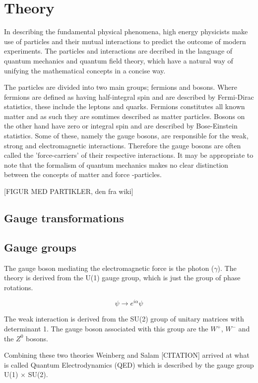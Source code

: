 \section{Theory}
In describing the fundamental physical phenomena, high energy physicists make use of particles and their mutual interactions to predict the outcome of modern experiments. The particles and interactions are decribed in the language of quantum mechanics and quantum field theory, which have a natural way of unifying the mathematical concepts in a concise way.

The particles are divided into two main groups; fermions and bosons. Where fermions are defined as having half-integral spin and are described by Fermi-Dirac statistics, these include the leptons and quarks. Fermions constitutes all known matter and as such they are somtimes described as matter particles. Bosons on the other hand have zero or integral spin and are described by Bose-Einstein statistics. Some of these, namely the gauge bosons, are responsible for the weak, strong and electromagnetic interactions. Therefore the gauge bosons are often called the 'force-carriers' of their respective interactions. It may be appropriate to note that the formalism of quantum mechanics makes no clear distinction between the concepts of matter and force -particles.

[FIGUR MED PARTIKLER, den fra wiki]

\subsection{Gauge transformations}

\subsection{Gauge groups}
The gauge boson mediating the electromagnetic force is the photon ($\gamma$). The theory is derived from the U(1) gauge group, which is just the group of phase rotations.

\begin{equation}
    \psi \rightarrow e^{i\alpha} \psi
\end{equation}

The weak interaction is derived from the SU(2) group of unitary matrices with determinant 1. The gauge boson associated with this group are the $W^+$, $W^-$ and the $Z^0$ bosons.

Combining these two theories Weinberg and Salam [CITATION] arrived at what is called Quantum Electrodynamics (QED) which is described by the gauge group U(1) $\times$ SU(2).

